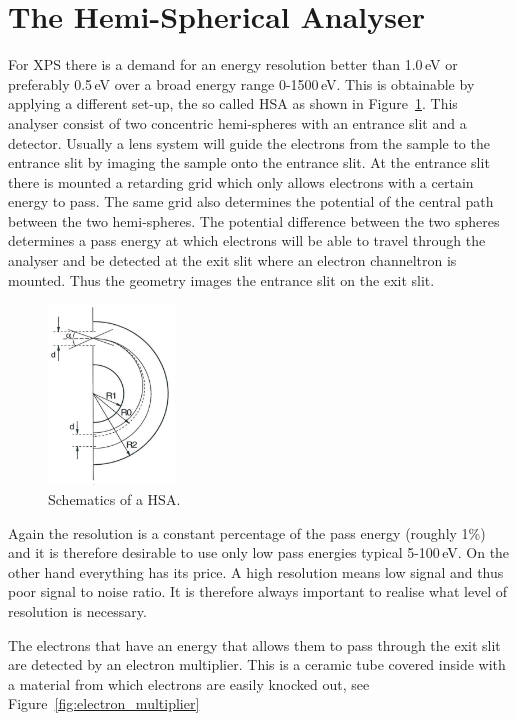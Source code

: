 \section{The Hemi-Spherical Analyser}
For XPS there is a demand for an energy resolution better than 1.0\,eV or preferably 0.5\,eV over a broad energy range 0-1500\,eV. This is obtainable by applying a different set-up, the so called HSA as shown in Figure~\ref{fig:schematics_hsa}. This analyser consist of two concentric hemi-spheres with an entrance slit and a detector. Usually a lens system will guide the electrons from the sample to the entrance slit by imaging the sample onto the entrance slit. At the entrance slit there is mounted a retarding grid which only allows electrons with a certain energy to pass. The same grid also determines the potential of the central path between the two hemi-spheres. The potential difference between the two spheres determines a pass energy at which electrons will be able to travel through the analyser and be detected at the exit slit where an electron channeltron is mounted. Thus the geometry images the entrance slit on the exit slit.

\begin{figure}[htbp]
\centering
\includegraphics[width=0.3\textwidth]{figures/03_02}
\caption{Schematics of a HSA.}
\label{fig:schematics_hsa}
\end{figure}

Again the resolution is a constant percentage of the pass energy (roughly 1\%) and it is therefore desirable to use only low pass energies typical 5-100\,eV. On the other hand everything has its price. A high resolution means low signal and thus poor signal to noise ratio. It is therefore always important to realise what level of resolution is necessary.

The electrons that have an energy that allows them to pass through the exit slit are detected by an electron multiplier. This is a ceramic tube covered inside with a material from which electrons are easily knocked out, see Figure~\ref{fig:electron_multiplier}

